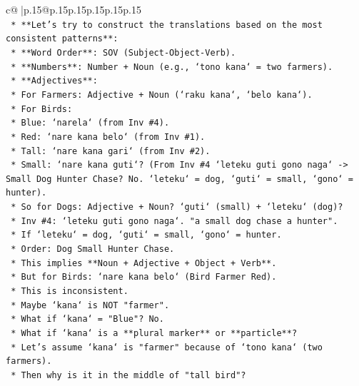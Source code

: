 \documentclass{article}
\begin{document}
{\begin{supertabular}{c@{$\;$}|p{.15\linewidth}@{}p{.15\linewidth}p{.15\linewidth}p{.15\linewidth}p{.15\linewidth}p{.15\linewidth}}
{{{\\ 
\texttt{    *   **Let's try to construct the translations based on the most consistent patterns**:} \\
\texttt{        *   **Word Order**: SOV (Subject{-}Object{-}Verb).} \\
\texttt{        *   **Numbers**: Number + Noun (e.g., `tono kana` = two farmers).} \\
\texttt{        *   **Adjectives**:} \\
\texttt{            *   For Farmers: Adjective + Noun (`raku kana`, `belo kana`).} \\
\texttt{            *   For Birds:} \\
\texttt{                *   Blue: `narela` (from Inv \#4).} \\
\texttt{                *   Red: `nare kana belo` (from Inv \#1).} \\
\texttt{                *   Tall: `nare kana gari` (from Inv \#2).} \\
\texttt{                *   Small: `nare kana guti`? (From Inv \#4 `leteku guti gono naga` {-}> Small Dog Hunter Chase? No. `leteku` = dog, `guti` = small, `gono` = hunter).} \\
\texttt{                *   So for Dogs: Adjective + Noun? `guti` (small) + `leteku` (dog)?} \\
\texttt{                *   Inv \#4: `leteku guti gono naga`. "a small dog chase a hunter".} \\
\texttt{                *   If `leteku` = dog, `guti` = small, `gono` = hunter.} \\
\texttt{                *   Order: Dog Small Hunter Chase.} \\
\texttt{                *   This implies **Noun + Adjective + Object + Verb**.} \\
\texttt{                *   But for Birds: `nare kana belo` (Bird Farmer Red).} \\
\texttt{                *   This is inconsistent.} \\
\texttt{                *   Maybe `kana` is NOT "farmer".} \\
\texttt{                *   What if `kana` = "Blue"? No.} \\
\texttt{                *   What if `kana` is a **plural marker** or **particle**?} \\
\texttt{                *   Let's assume `kana` is "farmer" because of `tono kana` (two farmers).} \\
\texttt{                *   Then why is it in the middle of "tall bird"?} \\
}}}
\end{supertabular}}
\end{document}
